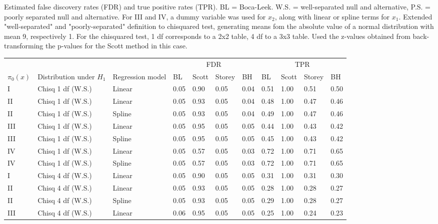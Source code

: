 \documentclass{article}\usepackage[]{graphicx}\usepackage[]{color}
\begin{document}
\clearpage

  Estimated false discovery rates (FDR) and true positive rates (TPR). BL = Boca-Leek. W.S. = well-separated null and alternative, P.S. = poorly separated null and alternative. For III and IV, a dummy variable was used for $x_{2}$, along with linear or spline terms for $x_1$. Extended "well-separated" and "poorly-separated" definition to chisquared test, generating means fom the absolute value of a normal distribution with mean 9, respectively 1. For the chisquared test, 1 df corresponds to a 2x2 table, 4 df to a 3x3 table. Used the z-values obtained from back-transforming the p-values for the Scott method in this case.
\begin{table}[ht]
\centering
\begin{tabular}{lll|llll|llll}
  \hline
  &&& \multicolumn{4}{c}{FDR} & \multicolumn{4}{c}{TPR}\\
 $\pi_0(x)$ &  Distribution under $H_1$ & Regression model & BL & Scott & Storey & BH & BL & Scott & Storey & BH    \\
 \hline
I & Chisq 1 df (W.S.) & Linear & 0.05 & 0.90 & 0.05 & 0.04 & 0.51 & 1.00 & 0.51 & 0.50 \\ 
  II & Chisq 1 df (W.S.) & Linear & 0.05 & 0.93 & 0.05 & 0.04 & 0.48 & 1.00 & 0.47 & 0.46 \\ 
  II & Chisq 1 df (W.S.) & Spline & 0.05 & 0.93 & 0.05 & 0.04 & 0.49 & 1.00 & 0.47 & 0.46 \\ 
  III & Chisq 1 df (W.S.) & Linear & 0.05 & 0.95 & 0.05 & 0.05 & 0.44 & 1.00 & 0.43 & 0.42 \\ 
  III & Chisq 1 df (W.S.) & Spline & 0.05 & 0.95 & 0.05 & 0.05 & 0.45 & 1.00 & 0.43 & 0.42 \\ 
  IV & Chisq 1 df (W.S.) & Linear & 0.05 & 0.57 & 0.05 & 0.03 & 0.72 & 1.00 & 0.71 & 0.65 \\ 
  IV & Chisq 1 df (W.S.) & Spline & 0.05 & 0.57 & 0.05 & 0.03 & 0.72 & 1.00 & 0.71 & 0.65 \\ 
   \hline
I & Chisq 4 df (W.S.) & Linear & 0.05 & 0.90 & 0.05 & 0.05 & 0.31 & 1.00 & 0.31 & 0.30 \\ 
  II & Chisq 4 df (W.S.) & Linear & 0.05 & 0.93 & 0.05 & 0.05 & 0.28 & 1.00 & 0.28 & 0.27 \\ 
  II & Chisq 4 df (W.S.) & Spline & 0.05 & 0.93 & 0.05 & 0.05 & 0.29 & 1.00 & 0.28 & 0.27 \\ 
  III & Chisq 4 df (W.S.) & Linear & 0.06 & 0.95 & 0.05 & 0.05 & 0.25 & 1.00 & 0.24 & 0.23 \\ 

\end{tabular}
\end{table}
\end{document}
